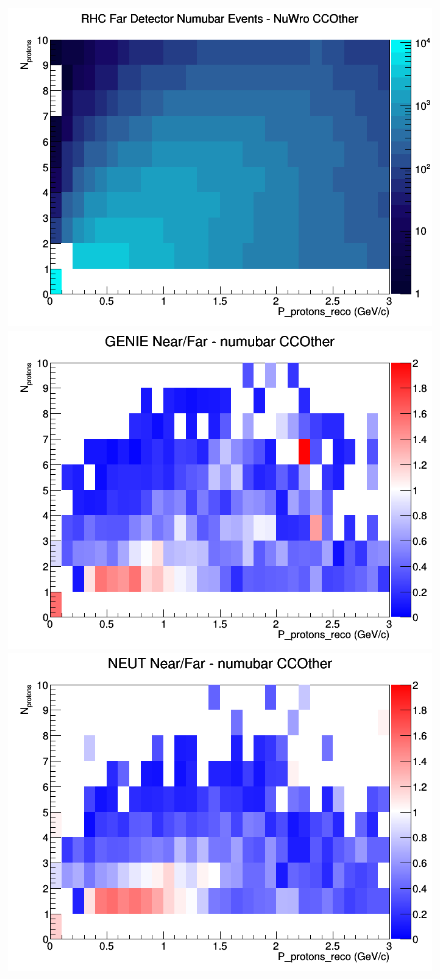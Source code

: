 \begin{figure}[h]
\endminipage
{}
\includegraphics[width=\linewidth]{eff_N_P/FGT/protons/CCOther_RHC_FD_numubar_N_P_NuWro.png}
\endminipage
\newline
{}
\includegraphics[width=\linewidth]{eff_N_P/FGT/protons/ratios/CCOther_GENIE_numubar_NF_N_P.png}
\endminipage
{}
\includegraphics[width=\linewidth]{eff_N_P/FGT/protons/ratios/CCOther_NEUT_numubar_NF_N_P.png}

\end{figure}

